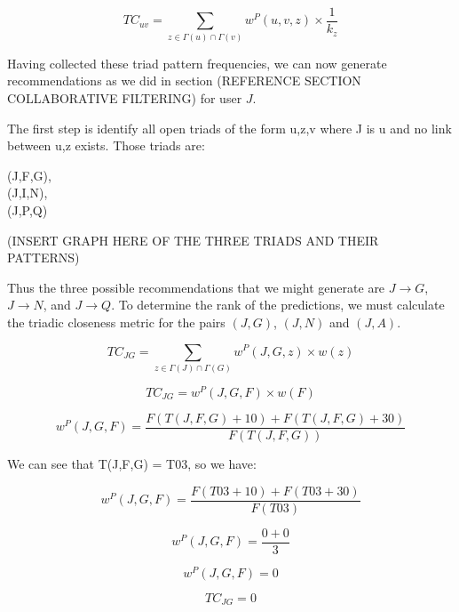 \begin{equation}
TC_{uv} = \sum_{z\in \Gamma(u)\cap \Gamma(v)} w^{P}(u,v,z) \times \frac{1}{k_z}
\end{equation}

Having collected these triad pattern frequencies, we can now generate recommendations as we did in section (REFERENCE SECTION COLLABORATIVE FILTERING) for user $J$.

The first step is identify all open triads of the form u,z,v where J is u and no link between u,z exists. Those triads are:

(J,F,G),\\
(J,I,N), \\ 
(J,P,Q)

(INSERT GRAPH HERE OF THE THREE TRIADS AND THEIR PATTERNS)

Thus the three possible recommendations that we might generate are $J \rightarrow G$, $J \rightarrow N$, and $J \rightarrow Q$. To determine the rank of the predictions, we must calculate the triadic closeness metric for the pairs $(J,G)$, $(J,N)$ and $(J,A)$. 

\begin{equation}
TC_{JG} = \sum_{z\in \Gamma(J)\cap \Gamma(G)} w^{P}(J, G, z) \times w(z)  
\end{equation}

\begin{equation}
TC_{JG} = w^{P}(J, G, F) \times w(F)  
\end{equation}

\begin{equation}
w^{P}(J,G,F) = \frac{F(T(J,F,G) + 10) + F(T(J,F,G) + 30)}{F(T(J,F,G))}
\end{equation}

We can see that T(J,F,G) = T03, so we have:

\begin{equation}
w^{P}(J,G,F) = \frac{F(T03 + 10) + F(T03 + 30)}{F(T03)}
\end{equation}

\begin{equation}
w^{P}(J,G,F) = \frac{0 + 0}{3}
\end{equation}

\begin{equation}
w^{P}(J,G,F) = 0
\end{equation}

\begin{equation}
TC_{JG} = 0
\end{equation}

